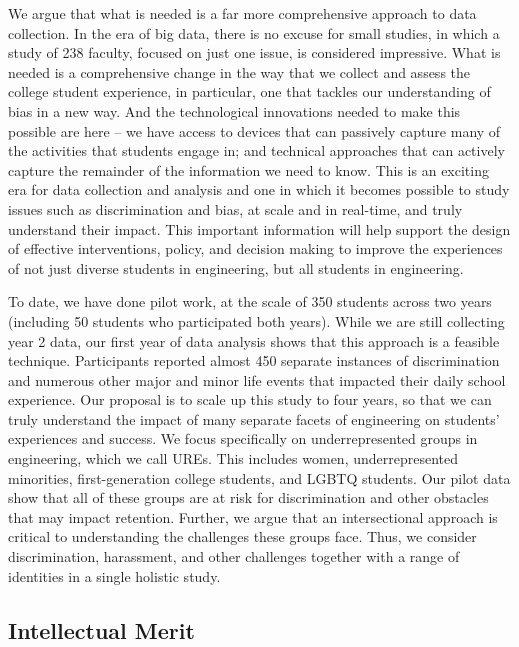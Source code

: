 We argue that what is needed is a far more comprehensive approach to data collection. In the era of big data, there is no excuse for small studies, in which a study of 238 faculty, focused on just one issue, is considered impressive. What is needed is a comprehensive change in the way that we collect and assess the college student experience, in particular, one that tackles our understanding of bias in a new way. And the technological innovations needed to make this possible are here -- we have access to devices that can passively capture many of the activities that students engage in; and technical approaches that can actively capture the remainder of the information we need to know. This is an exciting era for data collection and analysis and one in which it becomes possible to study issues such as discrimination and bias, at scale and in real-time, and truly understand their impact. This important information will help support the design of effective interventions, policy, and decision making to improve the experiences of not just diverse students in engineering, but all students in engineering. 
 
To date, we have done pilot work, at the scale of 350 students across two years (including 50 students who participated both years). While we are still collecting year 2 data, our first year of data analysis  shows that this approach is a feasible technique. Participants reported almost 450 separate instances of discrimination and numerous other major and minor life events that impacted their daily school experience. Our proposal is to scale up this study to four years, so that we can truly understand the impact of many separate facets of engineering on students’ experiences and success. We focus specifically on underrepresented groups in engineering, which we call UREs. This includes women, underrepresented minorities, first-generation college students, and LGBTQ students. Our pilot data show that all of these groups are at risk for discrimination and other obstacles that may impact retention. Further, we argue that an intersectional approach is critical to understanding the challenges these groups face. Thus, we consider discrimination, harassment, and other challenges together with a range of identities in a single holistic study.  
 

\subsection{Intellectual Merit}
\label{sec:questions}

